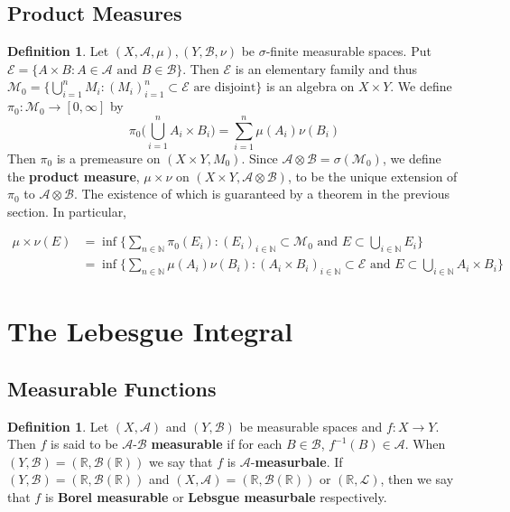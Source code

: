 \documentclass[12pt]{amsart}
\theoremstyle{definition}
\newtheorem{defn}[definition]{Definition}
\newcommand{\sig}{\sigma}
\newcommand{\N}{\mathbb{N}}
\newcommand{\R}{\mathbb{R}}
\newcommand{\MA}{\mathcal{A}}
\newcommand{\MB}{\mathcal{B}}
\newcommand{\ML}{\mathcal{L}}
\newcommand{\ME}{\mathcal{E}}
\newcommand{\MM}{\mathcal{M}}
\newcommand{\RG}{[0,\infty]}
\newcommand{\ld}[1]{\label{defn:#1}}
\begin{document}
	
	\newpage
	\subsection{Product Measures}
	
	\begin{defn} \ld{00000} 
		Let $(X,\MA, \mu), (Y,\MB, \nu)$ be $\sig$-finite measurable spaces. Put $\ME = \{A \times B: A \in \MA \text{ and } B \in \MB\}$. Then $\ME$ is an elementary family and thus $\MM_0 = \{\bigcup_{i =1}^n M_i: (M_i)_{i=1 }^n \subset \ME \text{ are disjoint}\}$ is an algebra on $X \times Y$. We define $\pi_0: \MM_0 \rightarrow \RG$ by $$\pi_0\bigg(\bigcup_{i=1}^n A_i \times B_i \bigg) = \sum_{i=1}^n\mu(A_i)\nu(B_i)$$ Then $\pi_0$ is a premeasure on $(X \times Y, M_0)$. Since $\MA \otimes \MB = \sig(\MM_0)$, we define the \textbf{product measure}, $\mu \times \nu$ on $(X \times Y, \MA \otimes \MB)$, to be the unique extension of $\pi_0$ to $\MA \otimes \MB$. The existence of which is guaranteed by a theorem in the previous section. In particular,
		
		\begin{align*}
			\mu \times \nu(E) 
			&= \inf \bigg\{\sum_{n \in \N}\pi_0(E_i): (E_i)_{i \in \N} \subset \MM_0 \text{ and } E \subset \bigcup_{i \in \N} E_i \bigg\}\\
			&= \inf \bigg\{\sum_{n \in \N}\mu(A_i)\nu(B_i): (A_i \times B_i)_{i \in \N} \subset \ME \text{ and } E \subset \bigcup_{i \in \N} A_i \times B_i \bigg \}
		\end{align*}
	\end{defn}
	
	
	
	
	
	
	
	
	
	
	
	
	
	
	
	
	
	\newpage
	\section{The Lebesgue Integral}
	
	\subsection{Measurable Functions}
	
	\begin{defn} \ld{00000} 
		Let $(X,\MA)$ and $(Y, \MB)$ be measurable spaces and $f:X \rightarrow Y$. Then $f$ is said to be $\MA$-$\MB$ \textbf{measurable} if for each $B \in \MB$, $f^{-1}(B) \in \MA$. When $(Y, \MB) = (\R, \MB(\R))$ we say that $f$ is $\MA$-\textbf{measurbale}. If $(Y,\MB) = (\R, \MB(\R))$ and $(X,\MA) = (\R, \MB(\R))$ or $(\R, \ML)$, then we say that $f$ is \textbf{Borel measurable} or \textbf{Lebsgue measurbale} respectively.
	\end{defn}
	
\end{document}
